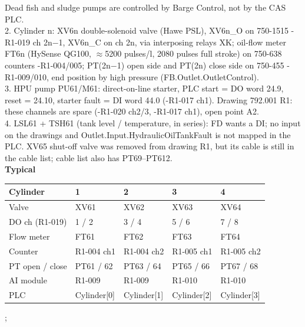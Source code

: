 {{       Dead fish and sludge pumps are controlled by Barge Control, not by the CAS PLC.\\[0.8mm]
    2. Cylinder n: XV6n double-solenoid valve (Hawe PSL), XV6n\_O on 750-1515 -R1-019 ch 2n$-$1, XV6n\_C on
       ch 2n, via interposing relays XK; oil-flow meter FT6n (HySense QG100, $\approx$5200 pulses/l,
       2080 pulses full stroke) on 750-638 counters -R1-004/005; PT(2n$-$1) open side and PT(2n) close side
       on 750-455 -R1-009/010, end position by high pressure (FB.Outlet.OutletControl).\\[0.8mm]
    3. HPU pump PU61/M61: direct-on-line starter, PLC start = DO word 24.9, reset = 24.10, starter fault =
       DI word 44.0 (-R1-017 ch1). \textcolor{pidcheck}{Drawing 792.001 R1: these channels are spare (-R1-020 ch2/3,
       -R1-017 ch1), open point A2.}\\[0.8mm]
    4. \textcolor{pidcheck}{LSL61 + TSH61 (tank level / temperature, in series): FD wants a DI; no input on the
       drawings and Outlet.Input.HydraulicOilTankFault is not mapped in the PLC. XV65 shut-off valve was removed
       from drawing R1, but its cable is still in the cable list; cable list also has PT69--PT612.}\\[1.5mm]
    \textbf{Typical}\\[0.5mm]
    \begin{tabular}{@{}lllll@{}}
      \toprule
      Cylinder & 1 & 2 & 3 & 4 \\
      \midrule
      Valve & XV61 & XV62 & XV63 & XV64 \\
      DO ch (R1-019) & 1 / 2 & 3 / 4 & 5 / 6 & 7 / 8 \\
      Flow meter & FT61 & FT62 & FT63 & FT64 \\
      Counter & R1-004 ch1 & R1-004 ch2 & R1-005 ch1 & R1-005 ch2 \\
      PT open / close & PT61 / 62 & PT63 / 64 & PT65 / 66 & PT67 / 68 \\
      AI module & R1-009 & R1-009 & R1-010 & R1-010 \\
      PLC & Cylinder[0] & Cylinder[1] & Cylinder[2] & Cylinder[3] \\
      \bottomrule
    \end{tabular}
  };
}
